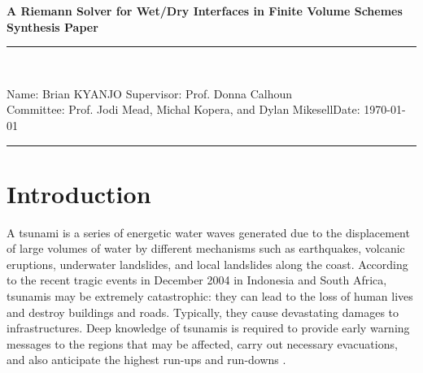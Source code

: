 \documentclass[10pt,a4paper]{article}
\newcommand{\student}{Brian KYANJO }
\newcommand{\course}{Prof. Jodi Mead, Michal Kopera, and Dylan Mikesell}
\newcommand{\assignment}{ Prof. Donna Calhoun}
\begin{document}
	
	\thispagestyle{empty}
	\begin{center}
		\textbf{A Riemann Solver for Wet/Dry Interfaces in Finite Volume Schemes\\[0.5cm]
			Synthesis Paper}
		\vspace{.2cm}
	\end{center}
	
	
	\begin{center}
		\rule{17cm}{0.2cm}\\[0.3cm]
	\end{center}	
	
	\noindent	Name: \student \hfill Supervisor: \assignment\\[0.1cm]
	Committee: \course \hfill Date: \today\\
	\rule{17cm}{0.05cm}
	\vspace{.2cm}
	
	\section{Introduction}
	
	A tsunami is a series of energetic water waves generated due to the displacement of large volumes of water by different mechanisms such as earthquakes, volcanic eruptions, underwater landslides, and local landslides along the coast. According to the recent tragic events in December 2004 in Indonesia and  South Africa, tsunamis may be extremely catastrophic: they can lead to the loss of human lives and destroy buildings and roads. Typically, they cause devastating damages to infrastructures. Deep knowledge of tsunamis is required to provide early warning messages to the regions that may be affected, carry out necessary evacuations, and also anticipate the highest run-ups and run-downs  \citep{sanchez2016uncertainty, dutykh2007water,dias2007dynamics}.
	
\end{document}
